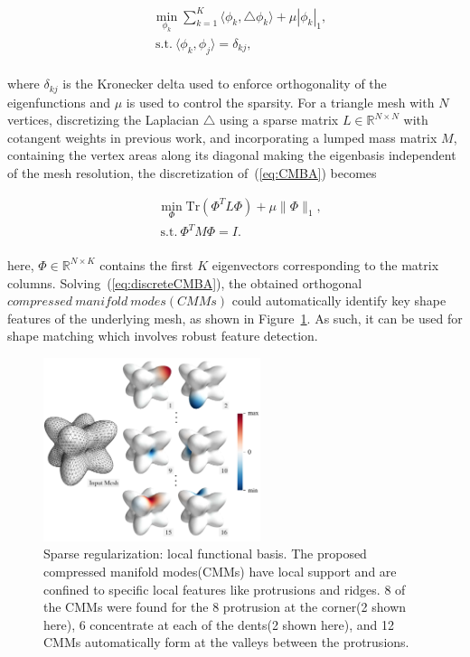 \small{
\begin{equation}
 \label{eq:CMBA}
 \begin{split}
 & \min_{\phi_{k}}  \sum_{k=1}^{K} \langle \phi_{k},\triangle\phi_{k} \rangle  +  \mu | \phi_{k} |_1,\\
 & ~\textrm{s.t.}~ \langle \phi_{k}, \phi_{j}  \rangle= \delta_{kj},
 \end{split}
\end{equation}
}
\\
where $\delta_{kj}$ is the Kronecker delta used to enforce orthogonality of the eigenfunctions and $\mu$ is used to control the sparsity.
For a triangle mesh with $N$ vertices, discretizing the Laplacian $\triangle$ using a sparse matrix $L\in\mathbb{R}^{N\times N}$ with cotangent weights in previous work, and incorporating a lumped mass matrix $M$, containing the vertex areas along its diagonal making the eigenbasis independent of the mesh resolution, the discretization of~(\ref{eq:CMBA}) becomes

\small{
\begin{equation}
 \label{eq:discreteCMBA}
 \begin{split}
 & \min_{\Phi} \textrm{Tr}(\Phi^{T}L \Phi)+\mu\| \Phi \|_1,\\
 & ~\textrm{s.t.}~ \Phi^{T}M\Phi=I.
 \end{split}
\end{equation}
}
\\
here, $\Phi\in\mathbb{R}^{N\times K}$ contains the first $K$ eigenvectors corresponding to the matrix columns.
Solving~(\ref{eq:discreteCMBA}), the obtained orthogonal $compressed~manifold~modes(CMMs)$ could automatically identify key shape features of the underlying mesh, as shown in Figure~\ref{fig:CMB}. As such, it can be used for shape matching which involves robust feature detection.


\begin{figure}[ht]
  \centering
  \includegraphics[width=2.5in]{images/CMB}
  \caption{Sparse regularization: local functional basis\cite{zhang2013point}. The proposed compressed manifold modes(CMMs) have local support and are confined to specific local features like protrusions and ridges. 8 of the CMMs were found for the 8 protrusion at the corner(2 shown here), 6 concentrate at each of the dents(2 shown here), and 12 CMMs automatically form at the valleys between the protrusions.}
  \label{fig:CMB}
\end{figure}



